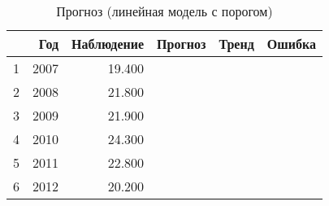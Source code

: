 \begin{table}[ht]
\centering
\begin{tabular}{rrrrrr}
  \hline
 & Год & Наблюдение & Прогноз & Тренд & Ошибка \\ 
  \hline
1 & 2007 & 19.400 &  &  &  \\ 
  2 & 2008 & 21.800 &  &  &  \\ 
  3 & 2009 & 21.900 &  &  &  \\ 
  4 & 2010 & 24.300 &  &  &  \\ 
  5 & 2011 & 22.800 &  &  &  \\ 
  6 & 2012 & 20.200 &  &  &  \\ 
   \hline
\end{tabular}
\caption{Прогноз (линейная модель с порогом)} 
\label{table:lin-fit-cv-prediction}
\end{table}
